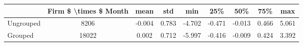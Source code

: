 \begin{tabular}{lcccccccc}
\toprule
{} &  Firm \$ \textbackslash times \$ Month &   mean &    std &    min &    25\% &    50\% &    75\% &    max \\
\midrule
Ungrouped &                   8206 & -0.004 &  0.783 & -4.702 & -0.471 & -0.013 &  0.466 &  5.061 \\
Grouped   &                  18022 &  0.002 &  0.712 & -5.997 & -0.416 & -0.009 &  0.424 &  3.392 \\
\bottomrule
\end{tabular}
